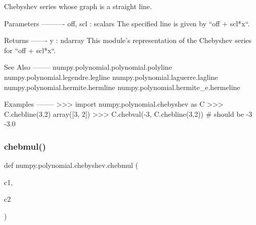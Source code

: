 \begin{DoxyVerb}Chebyshev series whose graph is a straight line.

Parameters
----------
off, scl : scalars
    The specified line is given by ``off + scl*x``.

Returns
-------
y : ndarray
    This module's representation of the Chebyshev series for
    ``off + scl*x``.

See Also
--------
numpy.polynomial.polynomial.polyline
numpy.polynomial.legendre.legline
numpy.polynomial.laguerre.lagline
numpy.polynomial.hermite.hermline
numpy.polynomial.hermite_e.hermeline

Examples
--------
>>> import numpy.polynomial.chebyshev as C
>>> C.chebline(3,2)
array([3, 2])
>>> C.chebval(-3, C.chebline(3,2)) # should be -3
-3.0\end{DoxyVerb}
 \mbox{\label{namespacenumpy_1_1polynomial_1_1chebyshev_accc03e34234155d96a6c6f3217c06578}} 
\subsubsection{\texorpdfstring{chebmul()}{chebmul()}}
{\footnotesize\ttfamily def numpy.\+polynomial.\+chebyshev.\+chebmul (\begin{DoxyParamCaption}\item[{}]{c1,  }\item[{}]{c2 }\end{DoxyParamCaption})}

